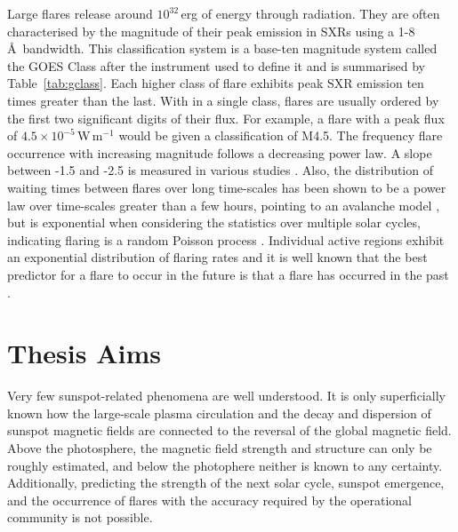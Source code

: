 Large flares release around $10^{32}$\,erg of energy through radiation. They are often characterised by the magnitude of their peak emission in \glspl{SXR} using a 1-8\,\AA\ bandwidth. This classification system is a base-ten magnitude system called the GOES Class after the instrument used to define it and is summarised by Table~\ref{tab:gclass}. Each higher class of flare exhibits peak SXR emission ten times greater than the last. With in a single class, flares are usually ordered by the first two significant digits of their flux. For example, a flare with a peak flux of $4.5\times10^{-5}$\,W\,m$^{-1}$ would be given a classification of M4.5. The frequency flare occurrence with increasing magnitude follows a decreasing power law. A slope between -1.5 and -2.5 is measured in various studies \citep[see Figure~\ref{fig:flarephase};][]{Aschwanden:2011}. 
Also, the distribution of waiting times between flares over long time-scales has been shown to be a power law over time-scales greater than a few hours, pointing to an avalanche model \citep{Lu:1993}, but is exponential when considering the statistics over multiple solar cycles, indicating flaring is a random Poisson process \citep{Wheatland:2000}. Individual active regions exhibit an exponential distribution of flaring rates \citep{Wheatland:2001} and it is well known that the best predictor for a flare to occur in the future is that a flare has occurred in the past \citep{Wheatland:2005}.

\section{Thesis Aims}\label{intro:aims}

Very few sunspot-related phenomena are well understood. It is only superficially known how the large-scale plasma circulation and the decay and dispersion of sunspot magnetic fields are connected to the reversal of the global magnetic field. Above the photosphere, the magnetic field strength and structure can only be roughly estimated, and below the photophere neither is known to any certainty. Additionally, predicting the strength of the next solar cycle, sunspot emergence, and the occurrence of flares with the accuracy required by the operational community is not possible. 

